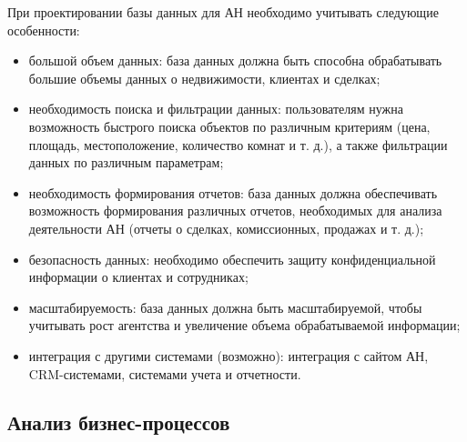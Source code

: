 При проектировании базы данных для АН необходимо учитывать следующие особенности:
\begin{itemize}
\item	большой объем данных: база данных должна быть способна обрабатывать большие объемы данных о недвижимости, клиентах и сделках;

\item	необходимость поиска и фильтрации данных: пользователям нужна возможность быстрого поиска объектов по различным критериям (цена, площадь, местоположение, количество комнат и т. д.), а также фильтрации данных по различным параметрам;

\item	необходимость формирования отчетов: база данных должна обеспечивать возможность формирования различных отчетов, необходимых для анализа деятельности АН (отчеты о сделках, комиссионных, продажах и т. д.);

\item	безопасность данных: необходимо обеспечить защиту конфиденциальной информации о клиентах и сотрудниках;

\item	масштабируемость: база данных должна быть масштабируемой, чтобы учитывать рост агентства и увеличение объема обрабатываемой информации;

\item	интеграция с другими системами (возможно): интеграция с сайтом АН, CRM-системами, системами учета и отчетности.
\end{itemize}

\subsection{Анализ бизнес-процессов}
	
